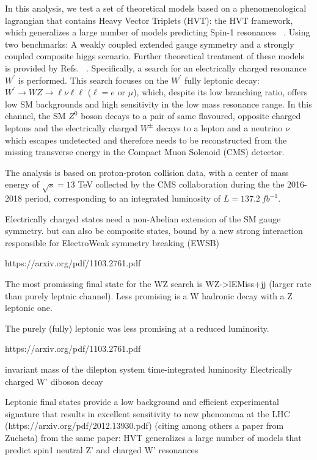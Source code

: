 In this analysis, we test a set of theoretical models based on a phenomenological
lagrangian that contains Heavy Vector Triplets (HVT): the HVT framework, which
generalizes a large number of models predicting Spin-1 resonances ~\cite{hvt2014}.
Using two benchmarks: A weakly coupled extended gauge symmetry and a
strongly coupled composite higgs scenario. Further theoretical treatment of these models
is provided by Refs. ~\cite{hvt2014,modelA1980,modelB2011}. Specifically, a search
for an electrically charged resonance $W^{\prime}$ is performed. This search focuses
on the $W^{\prime}$ fully leptonic decay:
$W^{\prime}\rightarrow WZ \rightarrow \ell\nu \ell\ell$ ($\ell = e$ or $\mu$),
which, despite its low branching ratio, offers low SM backgrounds and high
sensitivity in the low mass resonance range. In this channel, the SM $Z^{0}$
boson decays to a pair of same flavoured, opposite charged leptons and the
electrically charged $W^{\pm}$ decays to a lepton and a neutrino $\nu$ which escapes
undetected and therefore needs to be reconstructed from the missing transverse
energy in the Compact Muon Solenoid (CMS) detector.

The analysis is based on proton-proton collision data, with a center of mass
energy of $\sqrt{s}=13$ TeV collected by the CMS collaboration during the the
2016-2018 period, corresponding to an integrated luminosity of $L=137.2~fb^{-1}$.

Electrically charged states need a non-Abelian extension of the SM gauge symmetry.
but can also be composite states, bound by a new strong interaction responsible for
ElectroWeak symmetry breaking (EWSB)

https://arxiv.org/pdf/1103.2761.pdf


The most promissing final state for the WZ search is WZ->lEMiss+jj (larger rate
than purely leptnic channel). Less promising is a W hadronic decay with a Z leptonic
one.

The purely (fully) leptonic was less promising at a reduced luminosity.

https://arxiv.org/pdf/1103.2761.pdf

invariant mass of the dilepton system
time-integrated luminosity
Electrically charged W'
diboson decay

Leptonic final states provide a low background and efficient experimental signature
that results in excellent sensitivity to new phenomena at the LHC (https://arxiv.org/pdf/2012.13930.pdf)
(citing among others a paper from Zucheta)
from the same paper: HVT generalizes a large number of models that predict spin1 neutral
Z'  and charged W' resonances

